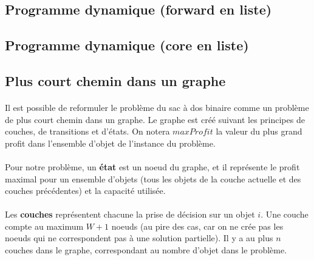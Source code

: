 \documentclass[12pt]{article}
\begin{document}
\subsection{Programme dynamique (forward en liste)}

\paragraph{}

\subsection{Programme dynamique (core en liste)}

\paragraph{}

\subsection{Plus court chemin dans un graphe}

\paragraph{}Il est possible de reformuler le problème du sac à dos binaire comme un problème de plus court chemin dans un graphe. Le graphe est créé suivant les principes de couches, de transitions et d'états. On notera $maxProfit$ la valeur du plus grand profit dans l'ensemble d'objet de l'instance du problème.

\paragraph{}Pour notre problème, un \textbf{état} est un noeud du graphe, et il représente le profit maximal pour un ensemble d'objets (tous les objets de la couche actuelle et des couches précédentes) et la capacité utilisée.

\paragraph{}Les \textbf{couches} représentent chacune la prise de décision sur un objet $i$. Une couche compte au maximum $W+1$ noeuds (au pire des cas, car on ne crée pas les noeuds qui ne correspondent pas à une solution partielle). Il y a au plus $n$ couches dans le graphe, correspondant au nombre d'objet dans le problème.
\end{document}
